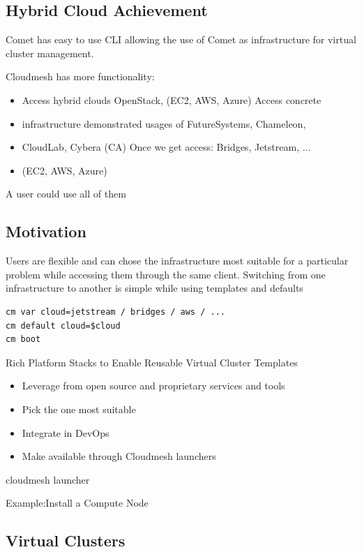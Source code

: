 \subsection{Hybrid Cloud Achievement}


Comet has easy to use CLI allowing the use of Comet as infrastructure
for virtual cluster management.


Cloudmesh has more functionality:
\begin{itemize}
\item Access hybrid clouds OpenStack, (EC2, AWS, Azure) Access
  concrete
\item infrastructure demonstrated usages of FutureSystems, Chameleon,
\item CloudLab, Cybera (CA) Once we get access: Bridges, Jetstream, ...
\item (EC2, AWS, Azure)
\end{itemize}
A user could use all of them

\subsection{Motivation}

Users are flexible and can chose the infrastructure most suitable for
a particular problem while accessing them through the same client.
Switching from one infrastructure to another is simple while using
templates and defaults

\begin{verbatim}
cm var cloud=jetstream / bridges / aws / ...
cm default cloud=$cloud
cm boot
\end{verbatim}

Rich Platform Stacks to Enable Reusable Virtual Cluster Templates

\begin{itemize}
\item Leverage from open source and proprietary services and tools
\item Pick the one most suitable
\item Integrate in DevOps
\item Make available through Cloudmesh launchers
\end{itemize}
cloudmesh launcher

Example:Install a Compute Node


\subsection{Virtual Clusters}

